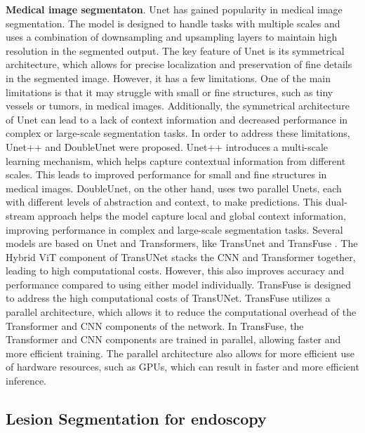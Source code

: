 \documentclass{article}
\begin{document}
\textbf{Medical image segmentaton}. Unet \cite{Unet} has gained popularity in medical image segmentation. The model is designed to handle tasks with multiple scales and uses a combination of downsampling and upsampling layers to maintain high resolution in the segmented output. The key feature of Unet is its symmetrical architecture, which allows for precise localization and preservation of fine details in the segmented image. However, it has a few limitations. One of the main limitations is that it may struggle with small or fine structures, such as tiny vessels or tumors, in medical images.
Additionally, the symmetrical architecture of Unet can lead to a lack of context information and decreased performance in complex or large-scale segmentation tasks. In order to address these limitations, Unet++ \cite{Unet++} and DoubleUnet \cite{DoubleUnet} were proposed. Unet++ introduces a multi-scale learning mechanism, which helps capture contextual information from different scales. This leads to improved performance for small and fine structures in medical images. DoubleUnet, on the other hand, uses two parallel Unets, each with different levels of abstraction and context, to make predictions. This dual-stream approach helps the model capture local and global context information, improving performance in complex and large-scale segmentation tasks. Several models are based on Unet and Transformers, like TransUnet \cite{transunet} and TransFuse \cite{transfuse}. The Hybrid ViT component of TransUNet stacks the CNN and Transformer together, leading to high computational costs. However, this also improves accuracy and performance compared to using either model individually. TransFuse is designed to address the high computational costs of TransUNet. TransFuse utilizes a parallel architecture, which allows it to reduce the computational overhead of the Transformer and CNN components of the network. In TransFuse, the Transformer and CNN components are trained in parallel, allowing faster and more efficient training. The parallel architecture also allows for more efficient use of hardware resources, such as GPUs, which can result in faster and more efficient inference.



\subsection{Lesion Segmentation for endoscopy}
\end{document}
